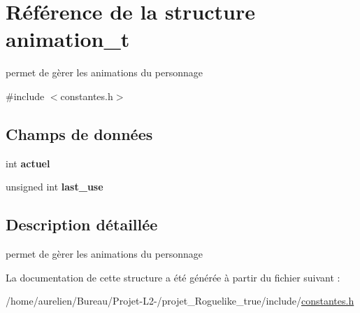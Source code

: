 \hypertarget{structanimation__t}{}\section{Référence de la structure animation\+\_\+t}
\label{structanimation__t}


permet de gèrer les animations du personnage  




{\ttfamily \#include $<$constantes.\+h$>$}

\subsection*{Champs de données}
\begin{DoxyCompactItemize}
\item 
\mbox{\label{structanimation__t_a4f59d14b31d468b5d5c6c7ab6e76d496}} 
int {\bfseries actuel}
\item 
\mbox{\label{structanimation__t_a4e52328888b9e25b64b883ff7d1a66e3}} 
unsigned int {\bfseries last\+\_\+use}
\end{DoxyCompactItemize}


\subsection{Description détaillée}
permet de gèrer les animations du personnage 

La documentation de cette structure a été générée à partir du fichier suivant \+:\begin{DoxyCompactItemize}
\item 
/home/aurelien/\+Bureau/\+Projet-\/\+L2-\//projet\+\_\+\+Roguelike\+\_\+true/include/\hyperlink{constantes_8h}{constantes.\+h}\end{DoxyCompactItemize}
